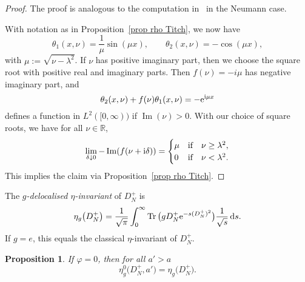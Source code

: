 \documentclass[pdftex]{sigma}%
\numberwithin{equation}{section}
\newtheorem{Proposition}[Theorem]{Proposition}
 { \theoremstyle{definition}
\newtheorem{Definition}[Theorem]{Definition}
\newtheorem{Note}[Theorem]{Note}
\newtheorem{Example}[Theorem]{Example}
\newtheorem{Remark}[Theorem]{Remark} }
\DeclareMathOperator{\Tr}{Tr}
\DeclareMathOperator{\Imag}{Im}
\newcommand{\R}{\mathbb{R}}
\begin{document}
\begin{proof}The proof is analogous to the computation in~\cite[Section~4.1]{Titchmarsh62} in the Neumann case.

With notation as in Proposition~\ref{prop rho Titch}, we now have
\[
\theta_1(x, \nu)= \frac{1}{\mu}\sin(\mu x),\qquad
\theta_2(x, \nu)= - \cos(\mu x),
\]
with $\mu := \sqrt{\nu - \lambda^2}$. If $\nu$ has positive imaginary part, then we choose the square root with positive real and imaginary parts. Then
 $f(\nu) = -i\mu$ has negative imaginary part, and
 \[
 \theta_2(x, \nu) + f(\nu) \theta_1(x, \nu) = -{\rm e}^{{\rm i}\mu x}
 \]
 defines a function in $L^2([0,\infty))$ if $\Imag(\nu)>0$.
 With our choice of square roots, we have for all $\nu \in \R$,
 \[
 \lim_{\delta \downarrow 0} -\Imag(f(\nu+{\rm i}\delta)) =
 \begin{cases}
 \mu & \text{if\quad $\nu \geq \lambda^2$},\\
 0 & \text{if\quad$\nu < \lambda^2$}.
 \end{cases}
 \]
 This implies the claim via
 Proposition~\ref{prop rho Titch}.
\end{proof}

The \emph{$g$-delocalised $\eta$-invariant} of $D_N^+$ \cite{Donnelly, HWW, Lott99} is
\[
\eta_g\big(D_N^+\big) = \frac{1}{\sqrt{\pi}}\int_0^{\infty} \Tr\big(g D_N^+ {\rm e}^{-s(D_N^+)^2}\big) \frac{1}{\sqrt{s}}\, {\rm d}s.
\]
If $g = e$, this equals the classical $\eta$-invariant of $D_N^+$.
\begin{Proposition}\label{prop cusp contr cylinder}
If $\varphi = 0$, then for all $a'>a$
\[
\eta^{0}_g\big(D_N^+, a'\big)=\eta_g\big(D_N^+\big).
\]
\end{Proposition}
\end{document}
